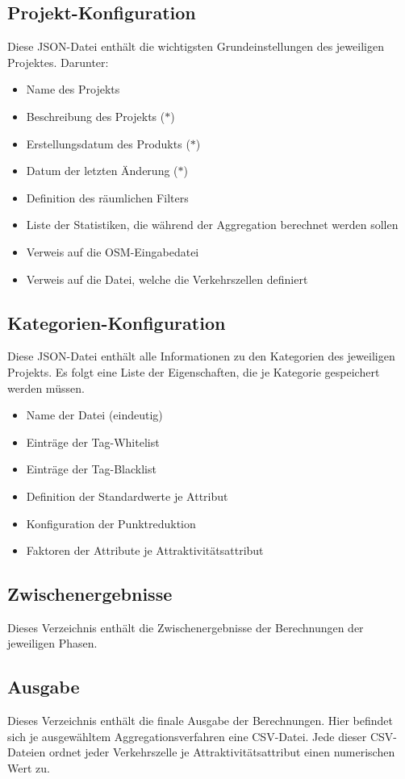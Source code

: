 \documentclass[parskip=full]{scrartcl} %
\begin{document}
\subsection*{Projekt-Konfiguration}
Diese JSON-Datei enthält die wichtigsten Grundeinstellungen des jeweiligen Projektes. Darunter:
\begin{itemize}
    \item Name des Projekts
    \item Beschreibung des Projekts ($\ast$)
    \item Erstellungsdatum des Produkts ($\ast$)
    \item Datum der letzten Änderung ($\ast$)
    \item Definition des räumlichen Filters
    \item Liste der Statistiken, die während der Aggregation berechnet werden sollen
    \item Verweis auf die OSM-Eingabedatei
    \item Verweis auf die Datei, welche die Verkehrszellen definiert
\end{itemize}


\subsection*{Kategorien-Konfiguration}
Diese JSON-Datei enthält alle Informationen zu den Kategorien des jeweiligen Projekts. Es folgt eine Liste der Eigenschaften, die je Kategorie gespeichert werden müssen.
\begin{itemize}
    \item Name der Datei (eindeutig)
    \item Einträge der Tag-Whitelist
    \item Einträge der Tag-Blacklist
    \item Definition der Standardwerte je Attribut
    \item Konfiguration der Punktreduktion
    \item Faktoren der Attribute je Attraktivitätsattribut
\end{itemize}


\subsection*{Zwischenergebnisse}
Dieses Verzeichnis enthält die Zwischenergebnisse der Berechnungen der jeweiligen Phasen.

\subsection*{Ausgabe} \hypertarget{finalresult}{}
Dieses Verzeichnis enthält die finale Ausgabe der Berechnungen. Hier befindet sich je ausgewähltem Aggregationsverfahren eine CSV-Datei. Jede dieser CSV-Dateien ordnet jeder Verkehrszelle je Attraktivitätsattribut einen numerischen Wert zu.
\end{document}
